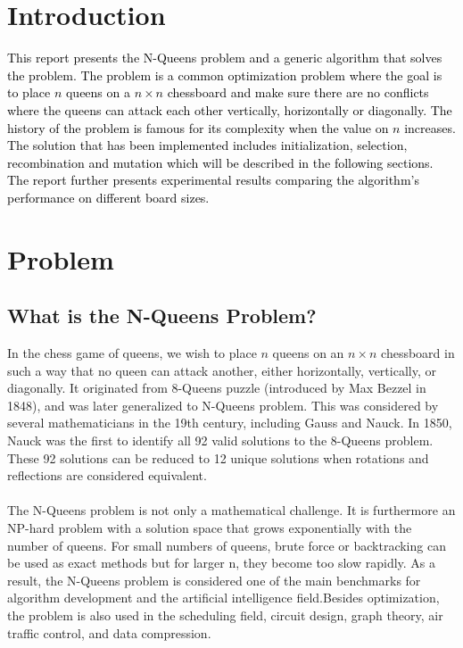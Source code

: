 \documentclass{scrartcl}
\title{\reportname}
\subtitle{An Evolutionary Algorithm for the N-Queen problem}
\author{Besan Ewir\quad Ebba Brage \\ Eddie Olofsgård\quad Sandra Carlsson}
\date{\today}
\begin{document}
\maketitle



\section{Introduction}
\label{sec:intro}

\textcolor{black}{This report presents the N-Queens problem and a generic algorithm that solves the problem. The problem is a common optimization problem where the goal is to place $n$ queens on a $n \times n$ chessboard and make sure there are no conflicts where the queens can attack each other vertically, horizontally or diagonally. The history of the problem is famous for its complexity when the value on $n$ increases. The solution that has been implemented includes initialization, selection, recombination and mutation which will be described in the following sections. The report further presents experimental results comparing the algorithm’s performance on different board sizes.}

\section{Problem}
\label{sec:problem_description}
\subsection*{What is the N-Queens Problem?}
In the chess game of queens, we wish to place $n$ queens on an $n \times n$ chessboard in such a way that no queen can attack another, either horizontally, vertically, or diagonally. It originated from 8-Queens puzzle (introduced by Max Bezzel in 1848), and was later generalized to N-Queens problem. This was considered by several mathematicians in the 19th century, including Gauss and Nauck. In 1850, Nauck was the first to identify all 92 valid solutions to the 8-Queens problem. These 92 solutions can be reduced to 12 unique solutions when rotations and reflections are considered equivalent. \\ \\ The N-Queens problem is not only a mathematical challenge. It is furthermore an NP-hard problem with a solution space that grows exponentially with the number of queens. For small numbers of queens, brute force or backtracking can be used as exact methods but for larger n, they become too slow rapidly. As a result, the N-Queens problem is considered one of the main benchmarks for algorithm development and the artificial intelligence field.Besides optimization, the problem is also used in the scheduling field, circuit design, graph theory, air traffic control, and data compression.
\end{document}
